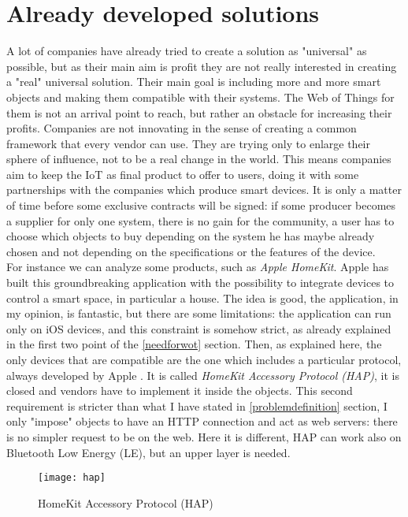 \section{Already developed solutions}
A lot of companies have already tried to create a solution as "universal" as possible, but as their main aim is profit they are not really interested in creating a "real" universal solution. Their main goal is including more and more smart objects and making them compatible with their systems. The Web of Things for them is not an arrival point to reach, but rather an obstacle for increasing their profits. Companies are not innovating in the sense of creating a common framework that every vendor can use. They are trying only to enlarge their sphere of influence, not to be a real change in the world. This means companies aim to keep the IoT as final product to offer to users, doing it with some partnerships with the companies which produce smart devices. It is only a matter of time before some exclusive contracts will be signed: if some producer becomes a supplier for only one system, there is no gain for the community, a user has to choose which objects to buy depending on the system he has maybe already chosen and not depending on the specifications or the features of the device.\\
For instance we can analyze some products, such as \textit{Apple HomeKit}. Apple has built this groundbreaking application with the possibility to integrate devices to control a smart space, in particular a house. The idea is good, the application, in my opinion, is fantastic, but there are some limitations: the application can run only on iOS devices, and this constraint is somehow strict, as already explained in the first two point of the \ref{needforwot} section. Then, as explained here, the only devices that are compatible are the one which includes a particular protocol, always developed by Apple \cite{applehomekitprotocol}. It is called \textit{HomeKit Accessory Protocol (HAP)}, it is closed and vendors have to implement it inside the objects. This second requirement is stricter than what I have stated in \ref{problemdefinition} section, I only "impose" objects to have an HTTP connection and act as web servers: there is no simpler request to be on the web. Here it is different, HAP can work also on Bluetooth Low Energy (LE), but an upper layer is needed.
\begin{figure}[h]
	\centering
	\texttt{[image: hap]}
	\caption{HomeKit Accessory Protocol (HAP)}
	\label{4.1: hap}
\end{figure}

